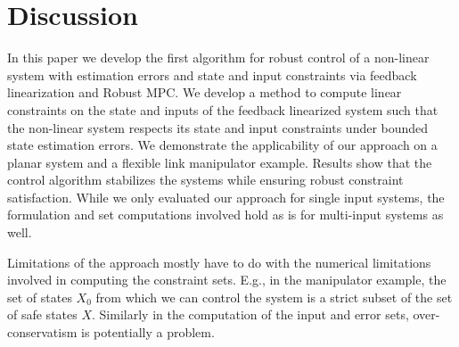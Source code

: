 \section{Discussion}
\label{sec:discussion}
In this paper we develop the first algorithm for robust control of a non-linear system with estimation errors and state and input constraints via feedback linearization and Robust MPC. 
We develop a method to compute linear constraints on the state and inputs of the feedback linearized system such that the non-linear system respects its state and input constraints under bounded state estimation errors. 
We demonstrate the applicability of our approach on a planar system and a flexible link manipulator example. Results show that the control algorithm stabilizes the systems while ensuring robust constraint satisfaction.%
While we only evaluated our approach for single input systems, the formulation and set computations involved hold as is for multi-input systems as well.

Limitations of the approach mostly have to do with the numerical limitations involved in computing the constraint sets.
E.g., in the manipulator example, the set of states $X_0$ from which we can control the system is a strict subset of the set of safe states $X$.
Similarly in the computation of the input and error sets, over-conservatism is potentially a problem.



